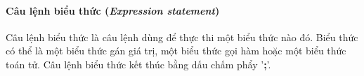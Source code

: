 \paragraph{Câu lệnh biểu thức (\textit{Expression statement})}            

\regexexprstmt

Câu lệnh biểu thức là câu lệnh dùng để thực thi một biểu thức nào đó. Biểu thức có thể là một biểu thức gán giá trị, một biểu thức gọi hàm hoặc một biểu thức toán tử. Câu lệnh biểu thức kết thúc bằng dấu chấm phẩy '\textbf{;}'.
